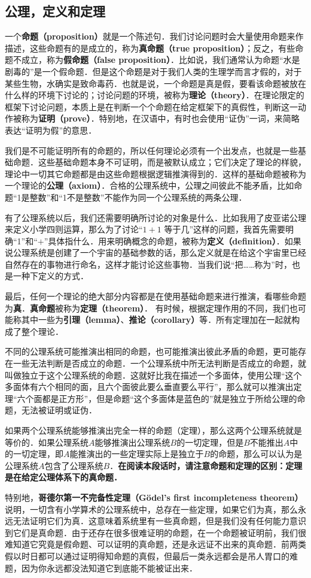 
\subsection{公理，定义和定理}
一个\textbf{命题（proposition）}就是一个陈述句．我们讨论问题时会大量使用命题来作描述，这些命题有的是成立的，称为\textbf{真命题（true proposition）}；反之，有些命题不成立，称为\textbf{假命题（false proposition）}．比如说，我们通常认为命题“水是剧毒的”是一个假命题．但是这个命题是对于我们人类的生理学而言才假的，对于某些生物，水确实是致命毒药．也就是说，一个命题是真是假，要看该命题被放在什么样的环境下讨论的；讨论问题的环境，被称为\textbf{理论（theory）}．在理论限定的框架下讨论问题，本质上是在判断一个个命题在给定框架下的真假性，判断这一动作被称为\textbf{证明（prove）}．特别地，在汉语中，有时也会使用“证伪”一词，来简略表达“证明为假”的意思．

我们是不可能证明所有的命题的，所以任何理论必须有一个出发点，也就是一些基础命题．这些基础命题本身不可证明，而是被默认成立；它们决定了理论的样貌，理论中一切其它命题都是由这些命题根据逻辑推演得到的．这样的基础命题被称为一个理论的\textbf{公理（axiom）}．合格的公理系统中，公理之间彼此不能矛盾，比如命题“1是整数”和“1不是整数”不能作为同一个公理系统的两条公理．

有了公理系统以后，我们还需要明确所讨论的对象是什么．比如我用了皮亚诺公理来定义小学四则运算，那么为了讨论“$1+1$ 等于几”这样的问题，我首先需要明确“1”和“$+$”具体指什么．用来明确概念的命题，被称为\textbf{定义（definition）}．如果说公理系统是创建了一个宇宙的基础参数的话，那么定义就是在给这个宇宙里已经自然存在的事物进行命名，这样才能讨论这些事物．当我们说“把……称为”时，也是一种下定义的方式．

最后，任何一个理论的绝大部分内容都是在使用基础命题来进行推演，看哪些命题为\textbf{真}．\textbf{真命题}被称为\textbf{定理（theorem）}． 有时候，根据定理作用的不同，我们也可能称其中一些为\textbf{引理（lemma）}、\textbf{推论（corollary）}等．所有定理加在一起就构成了整个理论．

不同的公理系统可能推演出相同的命题，也可能推演出彼此矛盾的命题，更可能存在一些无法判断是否成立的命题．一个公理系统中所无法判断是否成立的命题，就叫做独立于这个公理系统的命题．这就好比我在描述一个多面体，使用公理“这个多面体有六个相同的面，且六个面彼此要么垂直要么平行”，那么就可以推演出定理“六个面都是正方形”，但是命题“这个多面体是蓝色的”就是独立于所给公理的命题，无法被证明或证伪．

如果两个公理系统能够推演出完全一样的命题（定理），那么这两个公理系统就是等价的．如果公理系统$A$能够推演出公理系统$B$的一切定理，但是$B$不能推出$A$中的一切定理，即$A$能推演出的一些定理实际上是独立于$B$的命题，那么可以认为是公理系统$A$包含了公理系统$B$．\textbf{在阅读本段话时，请注意命题和定理的区别：定理是在给定公理体系下的真命题．}

特别地，\textbf{哥德尔第一不完备性定理（Gödel's first incompleteness theorem）}说明，一切含有小学算术的公理系统中，总存在一些定理，如果它们为真，那么永远无法证明它们为真．这意味着系统里有一些真命题，但是我们没有任何能力意识到它们是真命题．由于还存在很多很难证明的命题，在一个命题被证明前，我们很难知道它究竟是假命题、可以证明的真命题，还是永远证不出来的真命题．前两类假以时日都可以通过证明得知命题的真假，但最后一类永远都会是吊人胃口的难题，因为你永远都没法知道它到底能不能被证出来．
